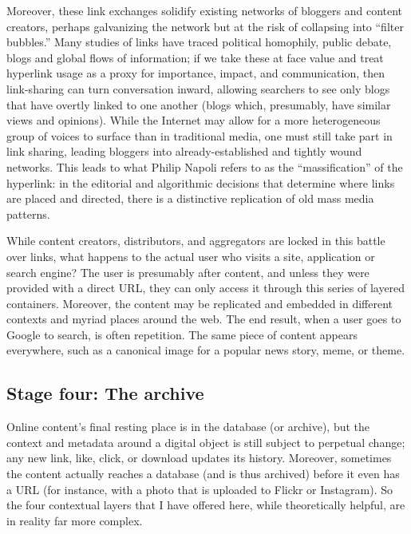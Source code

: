 Moreover, these link exchanges solidify existing networks of bloggers and content creators, perhaps galvanizing the network but at the risk of collapsing into ``filter bubbles.'' Many studies of links have traced political homophily, public debate, blogs and global flows of information; if we take these at face value and treat hyperlink usage as a proxy for importance, impact, and communication, then link-sharing can turn conversation inward, allowing searchers to see only blogs that have overtly linked to one another (blogs which, presumably, have similar views and opinions).  While the Internet may allow for a more heterogeneous group of voices to surface than in traditional media, one must still take part in link sharing, leading bloggers into already-established and tightly wound networks. This leads to what Philip Napoli refers to as the ``massification'' of the hyperlink: in the editorial and algorithmic decisions that determine where links are placed and directed, there is a distinctive replication of old mass media patterns. 

While content creators, distributors, and aggregators are locked in this battle over links, what happens to the actual user who visits a site, application or search engine? The user is presumably after content, and unless they were provided with a direct URL, they can only access it through this series of layered containers. Moreover, the content may be replicated and embedded in different contexts and myriad places around the web. The end result, when a user goes to Google to search, is often repetition. The same piece of content appears everywhere, such as a canonical image for a popular news story, meme, or theme.

\subsection{Stage four: The archive}

Online content's final resting place is in the database (or archive), but the context and metadata around a digital object is still subject to perpetual change; any new link, like, click, or download updates its history. Moreover, sometimes the content actually reaches a database (and is thus archived) before it even has a URL (for instance, with a photo that is uploaded to Flickr or Instagram). So the four contextual layers that I have offered here, while theoretically helpful, are in reality far more complex.

